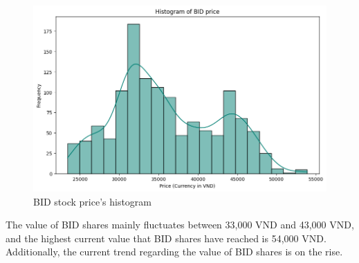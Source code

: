 \documentclass{ieeeojies}
\begin{document}
\begin{figure}[H]
\begin{minipage}{0.23\textwidth}
        \includegraphics[width=1\textwidth]{bibliography/Figure/BIDhist.png}
        \caption{BID stock price's histogram}
        \label{fig:3}
    \end{minipage}
\end{figure}
The value of BID shares mainly fluctuates between 33,000 VND and 43,000 VND, and the highest current value that BID shares have reached is 54,000 VND. Additionally, the current trend regarding the value of BID shares is on the rise.
\end{document}
